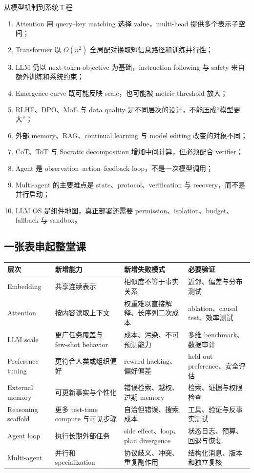 \documentclass[a4paper]{article}
\begin{document}
\begin{importantbox}{从模型机制到系统工程}
\begin{enumerate}
  \item Attention 用 query--key matching 选择 value，multi-head 提供多个表示子空间；
  \item Transformer 以 $O(n^2)$ 全局配对换取短信息路径和训练并行性；
  \item LLM 仍以 next-token objective 为基础，instruction following 与 safety 来自额外训练和系统约束；
  \item Emergence curve 既可能反映 scale，也可能被 metric threshold 放大；
  \item RLHF、DPO、MoE 与 data quality 是不同层次的设计，不能压成“模型更大”；
  \item 外部 memory、RAG、continual learning 与 model editing 改变的对象不同；
  \item CoT、ToT 与 Socratic decomposition 增加中间计算，但必须配合 verifier；
  \item Agent 是 observation--action--feedback loop，不是一次模型调用；
  \item Multi-agent 的主要难点是 state、protocol、verification 与 recovery，而不是并行启动；
  \item LLM OS 是组件地图，真正部署还需要 permission、isolation、budget、fallback 与 sandbox。
\end{enumerate}
\end{importantbox}

\subsection{一张表串起整堂课}

\begin{center}
\begin{longtable}{L{0.17\textwidth} L{0.22\textwidth} L{0.24\textwidth} L{0.25\textwidth}}
\toprule
层次 & 新增能力 & 新增失败模式 & 必要验证 \\
\midrule
\endhead
Embedding & 共享连续表示 & 相似度不等于事实关系 & 近邻、偏差与分布测试 \\
Attention & 按内容读取上下文 & 权重难以直接解释、长序列二次成本 & ablation、causal test、效率测试 \\
LLM scale & 更广任务覆盖与 few-shot behavior & 成本、污染、不可预测能力 & 多维 benchmark、数据审计 \\
Preference tuning & 更符合人类或组织偏好 & reward hacking、偏好偏差 & held-out preference、安全评估 \\
External memory & 可更新事实与个性化 & 错误检索、越权、过期 memory & 检索、证据与权限检查 \\
Reasoning scaffold & 更多 test-time compute 与可见步骤 & 自洽但错误、搜索成本 & 工具、验证与反事实测试 \\
Agent loop & 执行长期外部任务 & side effect、loop、plan divergence & 状态日志、预算、回退与恢复 \\
Multi-agent & 并行和 specialization & 协议歧义、冲突、重复副作用 & 结构化消息、版本和独立复核 \\
\bottomrule
\end{longtable}
\end{center}
\end{document}
